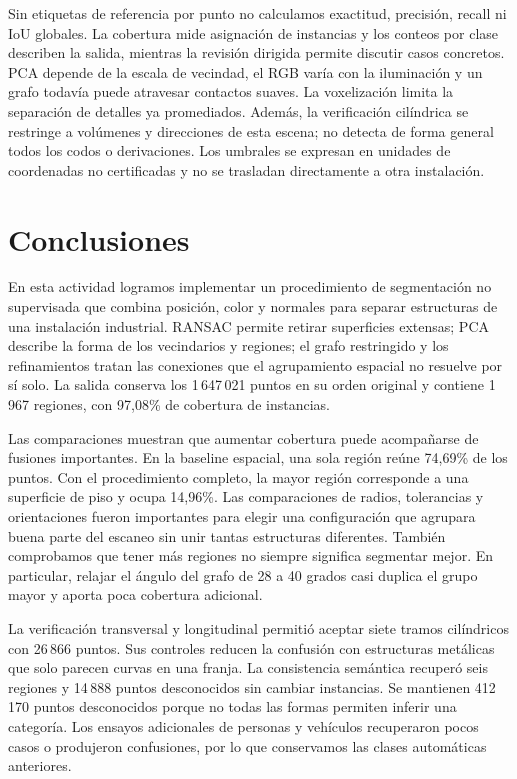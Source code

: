 \documentclass[journal,onecolumn]{IEEEtran}
\begin{document}
Sin etiquetas de referencia por punto no calculamos exactitud, precisión, recall ni IoU globales. La cobertura mide asignación de instancias y los conteos por clase describen la salida, mientras la revisión dirigida permite discutir casos concretos. PCA depende de la escala de vecindad, el RGB varía con la iluminación y un grafo todavía puede atravesar contactos suaves. La voxelización limita la separación de detalles ya promediados. Además, la verificación cilíndrica se restringe a volúmenes y direcciones de esta escena; no detecta de forma general todos los codos o derivaciones. Los umbrales se expresan en unidades de coordenadas no certificadas y no se trasladan directamente a otra instalación.

\section{Conclusiones}
En esta actividad logramos implementar un procedimiento de segmentación no supervisada que combina posición, color y normales para separar estructuras de una instalación industrial. RANSAC permite retirar superficies extensas; PCA describe la forma de los vecindarios y regiones; el grafo restringido y los refinamientos tratan las conexiones que el agrupamiento espacial no resuelve por sí solo. La salida conserva los 1\,647\,021 puntos en su orden original y contiene 1\,967 regiones, con 97,08\% de cobertura de instancias.

Las comparaciones muestran que aumentar cobertura puede acompañarse de fusiones importantes. En la baseline espacial, una sola región reúne 74,69\% de los puntos. Con el procedimiento completo, la mayor región corresponde a una superficie de piso y ocupa 14,96\%. Las comparaciones de radios, tolerancias y orientaciones fueron importantes para elegir una configuración que agrupara buena parte del escaneo sin unir tantas estructuras diferentes. También comprobamos que tener más regiones no siempre significa segmentar mejor. En particular, relajar el ángulo del grafo de 28 a 40 grados casi duplica el grupo mayor y aporta poca cobertura adicional.

La verificación transversal y longitudinal permitió aceptar siete tramos cilíndricos con 26\,866 puntos. Sus controles reducen la confusión con estructuras metálicas que solo parecen curvas en una franja. La consistencia semántica recuperó seis regiones y 14\,888 puntos desconocidos sin cambiar instancias. Se mantienen 412\,170 puntos desconocidos porque no todas las formas permiten inferir una categoría. Los ensayos adicionales de personas y vehículos recuperaron pocos casos o produjeron confusiones, por lo que conservamos las clases automáticas anteriores.
\end{document}

